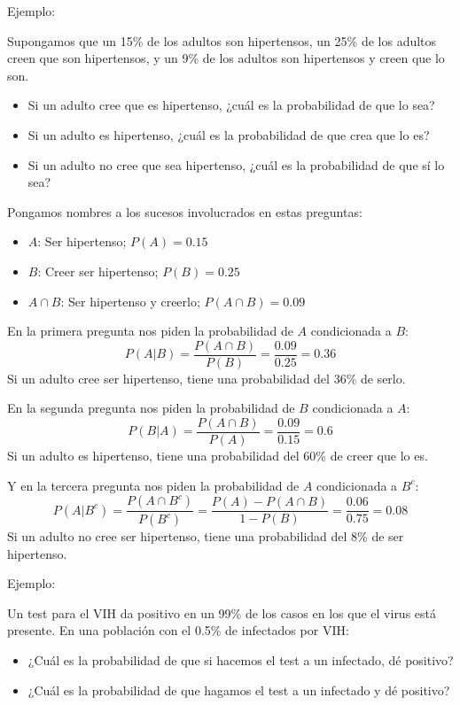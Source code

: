 \documentclass[
  spanish,
  letterpaper,
  DIV=11,
  numbers=noendperiod]{scrreprt}
\begin{document}
\begin{tcolorbox}
Ejemplo:

Supongamos que un 15\% de los adultos son hipertensos, un 25\% de los
adultos creen que son hipertensos, y un 9\% de los adultos son
hipertensos y creen que lo son.

\begin{itemize}
\item
  Si un adulto cree que es hipertenso, ¿cuál es la probabilidad de que
  lo sea?
\item
  Si un adulto es hipertenso, ¿cuál es la probabilidad de que crea que
  lo es?
\item
  Si un adulto no cree que sea hipertenso, ¿cuál es la probabilidad de
  que sí lo sea?
\end{itemize}

Pongamos nombres a los sucesos involucrados en estas preguntas:

\begin{itemize}
\item
  \(A\): Ser hipertenso; \(P(A)=0.15\)
\item
  \(B\): Creer ser hipertenso; \(P(B)=0.25\)
\item
  \(A\cap B\): Ser hipertenso y creerlo; \(P(A \cap B)=0.09\)
\end{itemize}

En la primera pregunta nos piden la probabilidad de \(A\) condicionada a
\(B\): \[
P(A|B)=\frac{P(A\cap B)}{P(B)}=\dfrac{0.09}{0.25}=0.36
\] Si un adulto cree ser hipertenso, tiene una probabilidad del 36\% de
serlo.

En la segunda pregunta nos piden la probabilidad de \(B\) condicionada a
\(A\): \[
P(B|A) =\frac{P(A\cap B)}{P(A)}=\frac{0.09}{0.15}=0.6
\] Si un adulto es hipertenso, tiene una probabilidad del 60\% de creer
que lo es.

Y en la tercera pregunta nos piden la probabilidad de \(A\) condicionada
a \(B^c\): \[
P(A|B^c) =\frac{P(A\cap B^c)}{P(B^c)}=\frac{P(A)-P(A\cap B)}{1-P(B)}=\frac{0.06}{0.75}=0.08
\] Si un adulto no cree ser hipertenso, tiene una probabilidad del 8\%
de ser hipertenso.

Ejemplo:

Un test para el VIH da positivo en un 99\% de los casos en los que el
virus está presente. En una población con el 0.5\% de infectados por
VIH:

\begin{itemize}
\item
  ¿Cuál es la probabilidad de que si hacemos el test a un infectado, dé
  positivo?
\item
  ¿Cuál es la probabilidad de que hagamos el test a un infectado y dé
  positivo?
\end{itemize}


\end{tcolorbox}
\end{document}
